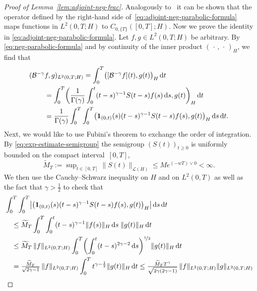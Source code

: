 \documentclass[reqno]{amsart}
\numberwithin{equation}{section}
\newcommand{\cB}{\mathcal{B}}
\newcommand{\norm}[2]{     \| #1       \|_{ #2 }}
\newcommand{\rd}{\mathop{}\!\mathrm{d}}
\theoremstyle{remark}
\theoremstyle{definition}
\begin{document}
\begin{proof}[Proof of Lemma~\ref{lem:adjoint-neg-frac}]
	Analogously to~\cite[Proposition~5.9]{DaPrato2014} 
	it can be shown that the operator defined
	by the right-hand side of~\eqref{eq:adjoint-neg-parabolic-formula} 
	maps functions in $L^2(0,T;H)$ to $C_{0,\{T\}}([0,T];H)$. 
	Now we prove the identity in \eqref{eq:adjoint-neg-parabolic-formula}. 
	Let ${f,g \in L^2(0,T;H)}$ be arbitrary. 
	By \eqref{eq:neg-parabolic-formula} 
	and by continuity of the inner product 
	$(\,\cdot\,,\,\cdot\,)_H$, 
	we find that
	\begin{align} 
	(\cB^{-\gamma} &f, g)_{L^2(0,T;H)} 
	= 
	\int_0^T \bigl( [\cB^{-\gamma}f](t), g(t) \bigr)_H \rd t 
	\notag 
	\\
	&= 
	\int_0^T 
	\biggl( 
	\frac{1}{\Gamma(\gamma)} 
	\int_0^t (t-s)^{\gamma-1} S(t-s) f(s) \rd s , g(t) 
	\biggr)_H \rd t 
	\notag 
	\\
	&= 
	\frac{1}{\Gamma(\gamma)} 
	\int_0^T \int_0^T 
	\bigl( \mathbf 1_{(0,t)}(s) (t-s)^{\gamma-1} S(t-s) f(s), g(t) \bigr)_H 
	\rd s \rd t . 
	\label{eq:proof:adjoint-neg-frac} 
	\end{align}
	Next, we would like to use Fubini's theorem 
	to exchange the order of integration. 
	By \eqref{eq:exp-estimate-semigroup} 
	the semigroup $(S(t))_{t\geq 0}$ is uniformly bounded 
	on the compact interval~$[0,T]$, 
	\[
	\widetilde{M}_T 
	:= 
	\sup\nolimits_{t\in[0,T]} \norm{ S(t) }{\mathscr L(H)} 
	\leq  
	M e^{(-wT) \vee 0}  
	< \infty.  
	\]
	We then use the 
	Cauchy--Schwarz inequality on $H$ and on $L^2(0,T)$ 
	as well as the fact that 
	$\gamma > \tfrac{1}{2}$ 
	to check that 
	\begin{align*}
	&\int_0^T \int_0^T 
	\bigl| 
	\bigl( \mathbf 1_{(0,t)}(s) (t-s)^{\gamma-1} S(t-s) f(s), g(t) \bigr)_H 
	\bigr| \rd s \rd t 
	\\
	&\quad\leq 
	\widetilde{M}_T 
	\int_0^T \int_0^t 
	(t-s)^{\gamma-1} \norm{ f(s) }{H}  \rd s 
	\;
	\norm{ g(t) }{H} \rd t 
	\\
	&\quad\leq 
	\widetilde{M}_T \, 
	\norm{f}{L^2(0,T;H)} 
	\int_0^T 
	\biggl(\int_0^t (t-s)^{2\gamma-2} \rd s \biggr)^{\nicefrac{1}{2}}
	\norm{ g(t) }{H} \rd t 
	\\
	&\quad = 
	\tfrac{ \widetilde{M}_T }{ \sqrt{2\gamma - 1} } 
	\, 
	\norm{f}{L^2(0,T;H)} 
	\int_0^T t^{\gamma-\frac{1}{2}} \norm{g(t)}{H} \rd t 
	\leq 
	\tfrac{ \widetilde{M}_T T^\gamma}{\sqrt{2\gamma(2\gamma - 1)}}   
	\,
	\norm{f}{L^2(0,T;H)} \norm{g}{L^2(0,T;H)} 
	\end{align*}

\end{proof}
\end{document}

